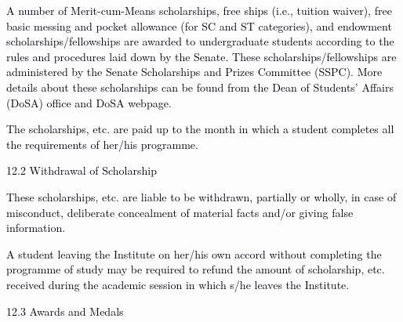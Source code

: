 \documentclass[12pt]{article}
\begin{document}
\vspace{\baselineskip}
\begin{justify}
{\fontsize{10pt}{12.0pt}\selectfont \textcolor[HTML]{00000A}{A number of Merit-cum-Means scholarships, free ships (i.e., tuition waiver), free basic messing and pocket allowance (for SC and ST categories), and endowment scholarships/fellowships are awarded to undergraduate students according to the rules and procedures laid down by the Senate. These scholarships/fellowships are administered by the Senate Scholarships and Prizes Committee (SSPC). More details about these scholarships can be found from the Dean of Students’ Affairs (DoSA) office and DoSA webpage.}\par}
\end{justify}\par


\vspace{\baselineskip}
{\fontsize{9pt}{10.8pt}\selectfont \textcolor[HTML]{00000A}{The scholarships, etc. are paid up to the month in which a student completes all the requirements of her/his programme.}\par}\par


\vspace{\baselineskip}
\textcolor[HTML]{00000A}{12.2 Withdrawal of Scholarship}\par


\vspace{\baselineskip}
\begin{justify}
{\fontsize{10pt}{12.0pt}\selectfont \textcolor[HTML]{00000A}{These scholarships, etc. are liable to be withdrawn, partially or wholly, in case of misconduct, deliberate concealment of material facts and/or giving false information.}\par}
\end{justify}\par


\vspace{\baselineskip}
\begin{justify}
{\fontsize{10pt}{12.0pt}\selectfont \textcolor[HTML]{00000A}{A student leaving the Institute on her/his own accord without completing the programme of study may be required to refund the amount of scholarship, etc. received during the academic session in which s/he leaves the Institute.}\par}
\end{justify}\par


\vspace{\baselineskip}
\textcolor[HTML]{00000A}{12.3 Awards and Medals}\par
\end{document}
